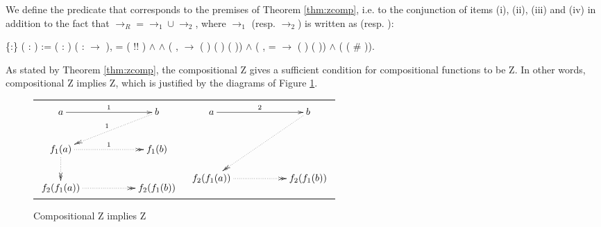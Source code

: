 \documentclass[a4paper]{article}
\begin{document}
We define the predicate  that corresponds to the
premises of Theorem \ref{thm:zcomp}, i.e. to the conjunction of items
(i), (ii), (iii) and (iv) in addition to the fact that
$\to_R = \to_1 \cup \to_2$, where $\to_1$ (resp. $\to_2$) is written
as  (resp. ):

\begin{coqdoccode}
  \coqdocemptyline \coqdocnoindent {}
   \{:\} (
  : ) := \coqdoctac{\ensuremath{\exists}}
  ( :  )
  ( : 
  \ensuremath{\rightarrow} ),  =
  ( !\coqdocvar{\_}! ) \ensuremath{\land}
    
  \ensuremath{\land} (\coqdockw{\ensuremath{\forall}} 
  ,   
  \ensuremath{\rightarrow} ( )
  ( ) ( ))
  \ensuremath{\land} (\coqdockw{\ensuremath{\forall}} 
  ,  =  
  \ensuremath{\rightarrow} ( )
   ( )) \ensuremath{\land}
  (  
  ( \# )).\coqdoceol \coqdocemptyline
  \coqdocemptyline
\end{coqdoccode}

As stated by Theorem \ref{thm:zcomp}, the compositional Z gives
    a sufficient condition for compositional functions to be Z. In
    other words, compositional Z implies Z, which is justified by the
    diagrams of Figure \ref{fig:zcomp}.


    \begin{figure}[h]\begin{tabular}{l@{\hskip 3cm}l} $\xymatrix{ a
    \ar@{->}[rr]^1 && b \ar@{.>>}[dll]_1\\ f_1(a)\ar@{.>>}[d]
    \ar@{.>>}[rr]^1 && f_1(b) \\ f_2(f_1(a)) \ar@{.>>}[rr] &&
    f_2(f_1(b)) }$ & $\xymatrix{ a \ar@{->}[rr]^2 && b
    \ar@{.>>}[ddll]\\ & & \\ f_2(f_1(a)) \ar@{.>>}[rr] && f_2(f_1(b))
    }$ \end{tabular}\caption{Compositional Z implies
    Z}\label{fig:zcomp}\end{figure}
\end{document}
